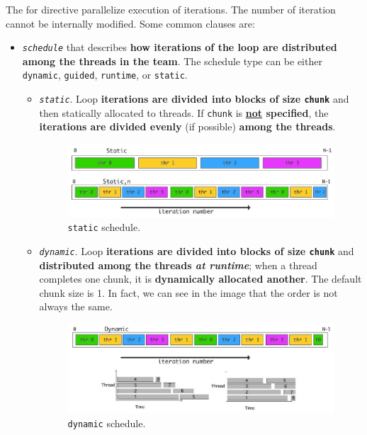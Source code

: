 \noindent
The for directive parallelize execution of iterations. The number of iteration cannot be internally modified. Some common clauses are:
\begin{itemize}
    \item \texttt{\emph{schedule}} that describes \textbf{how iterations of the loop are distributed among the threads in the team}. The schedule type can be either \texttt{dynamic}, \texttt{guided}, \texttt{runtime}, or \texttt{static}.
    \begin{itemize}
        \item \texttt{\emph{static}}. Loop \textbf{iterations are divided into blocks of size \texttt{chunk}} and then statically allocated to threads. If \texttt{chunk} is \textbf{\underline{not} specified}, the \textbf{iterations are divided evenly} (if possible) \textbf{among the threads}.
        \newpage
        \begin{figure}[!htp]
            \centering
            \includegraphics[width=\textwidth]{img/openmp-for-2.pdf}
            \caption{\texttt{static} schedule.}
        \end{figure}

        \item \texttt{\emph{dynamic}}. Loop \textbf{iterations are divided into blocks of size \texttt{chunk}} and \textbf{distributed among the threads \emph{at runtime}}; when a thread completes one chunk, it is \textbf{dynamically allocated another}. The default chunk size is 1. In fact, we can see in the image that the order is not always the same.
        \begin{figure}[!htp]
            \centering
            \includegraphics[width=\textwidth]{img/openmp-for-3.pdf}
            \caption{\texttt{dynamic} schedule.}
        \end{figure}
        

\end{itemize}
\end{itemize}
